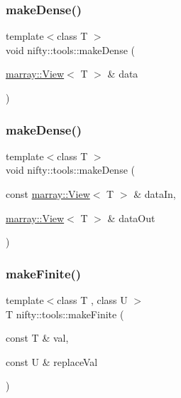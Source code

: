\mbox{\label{namespacenifty_1_1tools_a2c8c36d25cd0360146bec83f981de045}} 
\subsubsection{\texorpdfstring{make\+Dense()}{makeDense()}\hspace{0.1cm}{\footnotesize\ttfamily [1/2]}}
{\footnotesize\ttfamily template$<$class T $>$ \\
void nifty\+::tools\+::make\+Dense (\begin{DoxyParamCaption}\item[{\hyperlink{classandres_1_1View}{marray\+::\+View}$<$ T $>$ \&}]{data }\end{DoxyParamCaption})}

\mbox{\label{namespacenifty_1_1tools_a0fba3a0bb159e35a054e7ea8f258c4c3}} 
\subsubsection{\texorpdfstring{make\+Dense()}{makeDense()}\hspace{0.1cm}{\footnotesize\ttfamily [2/2]}}
{\footnotesize\ttfamily template$<$class T $>$ \\
void nifty\+::tools\+::make\+Dense (\begin{DoxyParamCaption}\item[{const \hyperlink{classandres_1_1View}{marray\+::\+View}$<$ T $>$ \&}]{data\+In,  }\item[{\hyperlink{classandres_1_1View}{marray\+::\+View}$<$ T $>$ \&}]{data\+Out }\end{DoxyParamCaption})}

\mbox{\label{namespacenifty_1_1tools_abefcf35b4e6658bb8179a41a2de97d9e}} 
\subsubsection{\texorpdfstring{make\+Finite()}{makeFinite()}}
{\footnotesize\ttfamily template$<$class T , class U $>$ \\
T nifty\+::tools\+::make\+Finite (\begin{DoxyParamCaption}\item[{const T \&}]{val,  }\item[{const U \&}]{replace\+Val }\end{DoxyParamCaption})\hspace{0.3cm}{\ttfamily [inline]}}

